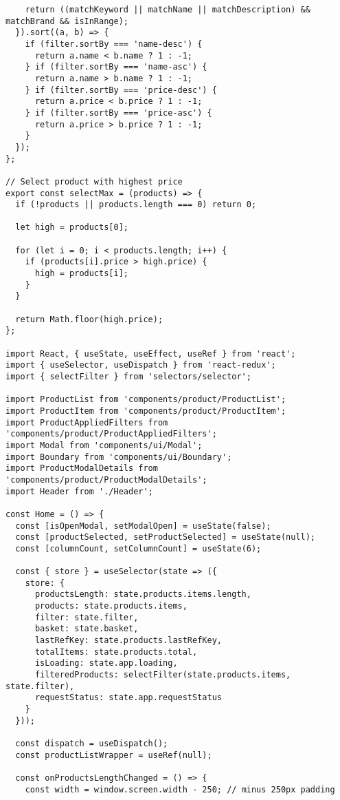 \begin{lstlisting}
    return ((matchKeyword || matchName || matchDescription) && matchBrand && isInRange);
  }).sort((a, b) => {
    if (filter.sortBy === 'name-desc') {
      return a.name < b.name ? 1 : -1;
    } if (filter.sortBy === 'name-asc') {
      return a.name > b.name ? 1 : -1;
    } if (filter.sortBy === 'price-desc') {
      return a.price < b.price ? 1 : -1;
    } if (filter.sortBy === 'price-asc') {
      return a.price > b.price ? 1 : -1;
    }
  });
};

// Select product with highest price
export const selectMax = (products) => {
  if (!products || products.length === 0) return 0;

  let high = products[0];

  for (let i = 0; i < products.length; i++) {
    if (products[i].price > high.price) {
      high = products[i];
    }
  }

  return Math.floor(high.price);
};

import React, { useState, useEffect, useRef } from 'react';
import { useSelector, useDispatch } from 'react-redux';
import { selectFilter } from 'selectors/selector';

import ProductList from 'components/product/ProductList';
import ProductItem from 'components/product/ProductItem';
import ProductAppliedFilters from 'components/product/ProductAppliedFilters';
import Modal from 'components/ui/Modal';
import Boundary from 'components/ui/Boundary';
import ProductModalDetails from 'components/product/ProductModalDetails';
import Header from './Header';

const Home = () => {
  const [isOpenModal, setModalOpen] = useState(false);
  const [productSelected, setProductSelected] = useState(null);
  const [columnCount, setColumnCount] = useState(6);

  const { store } = useSelector(state => ({
    store: {
      productsLength: state.products.items.length,
      products: state.products.items,
      filter: state.filter,
      basket: state.basket,
      lastRefKey: state.products.lastRefKey,
      totalItems: state.products.total,
      isLoading: state.app.loading,
      filteredProducts: selectFilter(state.products.items, state.filter),
      requestStatus: state.app.requestStatus
    }
  }));

  const dispatch = useDispatch();
  const productListWrapper = useRef(null);

  const onProductsLengthChanged = () => {
    const width = window.screen.width - 250; // minus 250px padding


\end{lstlisting}
